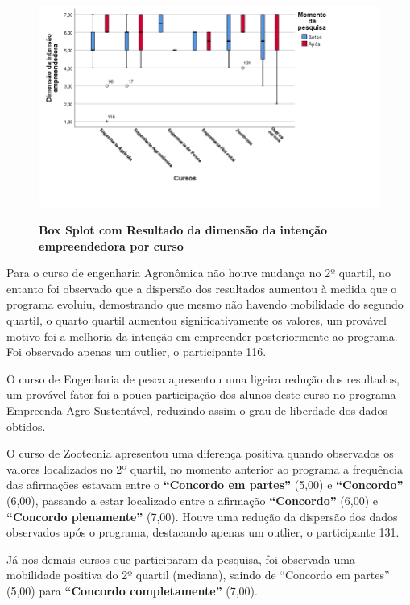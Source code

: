 \begin{figure}[H]
\centering
\caption{\textbf{Box Splot com Resultado da dimensão da intenção empreendedora por curso}}
\includegraphics[scale=0.6]{Imagens/boxplot_intencao_empreendedora.png}
\label{figura_boxplot_intencao}
\end{figure}



Para o curso de engenharia Agronômica não houve mudança no 2º quartil, no entanto foi observado que a dispersão dos resultados aumentou à medida que o programa evoluiu, demostrando que mesmo não havendo mobilidade do segundo quartil, o quarto quartil aumentou significativamente os valores, um provável motivo foi a melhoria da intenção em empreender posteriormente ao programa. Foi observado apenas um outlier, o participante 116.

O curso de Engenharia de pesca apresentou uma ligeira redução dos resultados, um provável fator foi a pouca participação dos alunos deste curso no programa Empreenda Agro Sustentável, reduzindo assim o grau de liberdade dos dados obtidos.  

O curso de Zootecnia apresentou uma diferença positiva quando observados os valores localizados no 2º quartil, no momento anterior ao programa a frequência das afirmações estavam entre o \textbf{“Concordo em partes”} (5,00) e \textbf{“Concordo”} (6,00), passando a estar localizado entre a afirmação \textbf{“Concordo”} (6,00) e \textbf{“Concordo plenamente”} (7,00). Houve uma redução da dispersão dos dados observados após o programa, destacando apenas um outlier, o participante 131. 

Já nos demais cursos que participaram da pesquisa, foi observada uma mobilidade positiva do 2º quartil (mediana), saindo de “Concordo em partes” (5,00) para \textbf{“Concordo completamente”} (7,00).




